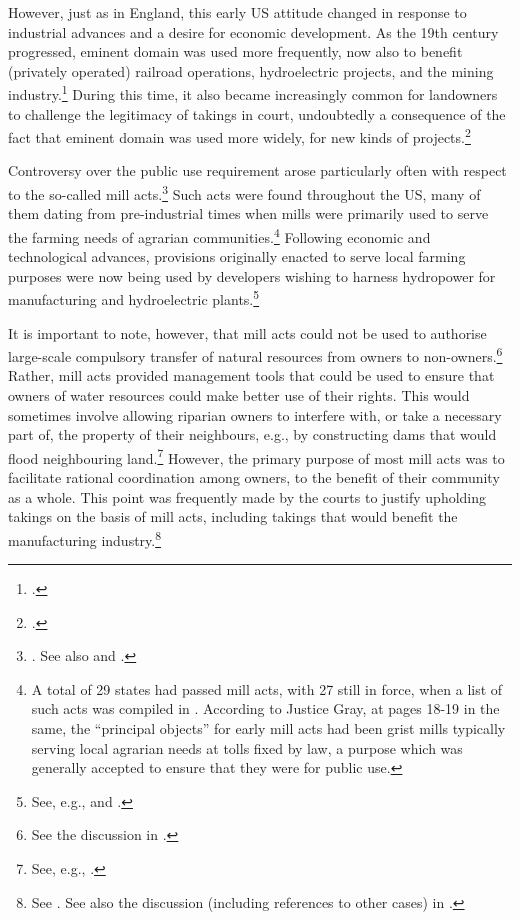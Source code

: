 However, just as in England, this early US attitude changed in response to industrial advances and a desire for economic development. As the 19th century progressed, eminent domain was used more frequently, now also to benefit (privately operated) railroad operations, hydroelectric projects, and the mining industry.\footcite[23-33]{meidinger80} During this time, it also became increasingly common for landowners to challenge the legitimacy of takings in court, undoubtedly a consequence of the fact that eminent domain was used more widely, for new kinds of projects.\footcite[24]{meidinger80} 

Controversy over the public use requirement arose particularly often with respect to the so-called mill acts.\footnote{\cite[24]{meidinger80}. See also \cite[306-313]{johnson11} and \cite[251-252]{horwitz73}.} Such acts were found throughout the US, many of them dating from pre-industrial times when mills were primarily used to serve the farming needs of agrarian communities.\footnote{A total of 29 states had passed mill acts, with 27 still in force, when a list of such acts was compiled in \cite[17]{head85}. According to Justice Gray, at pages 18-19 in the same, the ``principal objects'' for early mill acts had been grist mills typically serving local agrarian needs at tolls fixed by law, a purpose which was generally accepted to ensure that they were for public use.} Following economic and technological advances, provisions originally enacted to serve local farming purposes were now being used by developers wishing to harness hydropower for manufacturing and hydroelectric plants.\footnote{See, e.g., \cite[18-21]{head85} and \cite[449-452]{minn06}.}

It is important to note, however, that mill acts could not be used to authorise large-scale compulsory transfer of natural resources from owners to non-owners.\footnote{See the discussion in \cite{head85}.} Rather, mill acts provided management tools that could be used to ensure that owners of water resources could make better use of their rights. This would sometimes involve allowing riparian owners to interfere with, or take a necessary part of, the property of their neighbours, e.g., by constructing dams that would flood neighbouring land.\footnote{See, e.g., \cite[265]{staples03}.} However, the primary purpose of most mill acts was to facilitate rational coordination among owners, to the benefit of their community as a whole. This point was frequently made by the courts to justify upholding takings on the basis of mill acts, including takings that would benefit the manufacturing industry.\footnote{See \cite{fiske31}. See also the discussion (including references to other cases) in \cite{head85}.}

